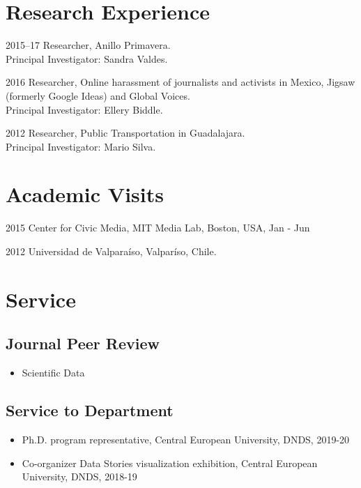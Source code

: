 \documentclass{academiccv}
\begin{document}
\section*{Research Experience}
\begin{tablist}
	\item[2015--17] 	\tab Researcher, Anillo Primavera. \\
									Principal Investigator: Sandra Valdes.
	\item[2016] 	\tab Researcher, Online harassment of journalists and activists in Mexico, Jigsaw (formerly Google Ideas) and Global Voices. \\
								Principal Investigator: Ellery Biddle.
	\item[2012] \tab Researcher, Public Transportation in Guadalajara. \\
							Principal Investigator: Mario Silva.
\end{tablist}

\section*{Academic Visits}
\begin{tablist}
	\item[2015] 	\tab Center for Civic Media, MIT Media Lab, Boston, USA, Jan - Jun
	\item[2012] 	\tab Universidad de Valparaíso, Valparíso, Chile.
\end{tablist}

\section*{Service}
\subsection*{Journal Peer Review}
\begin{itemize}
  \item Scientific Data
\end{itemize}

\subsection*{Service to Department}
\begin{itemize}
	\item Ph.D. program representative, Central European University, DNDS, 2019-20
	\item Co-organizer Data Stories visualization exhibition, Central European University, DNDS, 2018-19
\end{itemize}
\end{document}
